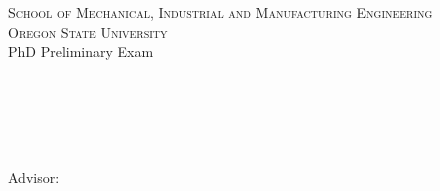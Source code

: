 \documentclass[12pt, oneside]{book} %
\newcommand\BackgroundPic{%
\put(-250,-160){%
\parbox[b][\paperheight]{\paperwidth}{%
\vfill
\centering
\texttt{[image: symbol.jpg]}%
\vfill
}}}
\begin{document}

\pagestyle{empty} %
\frontmatter %

\begin{titlepage}
\begin{center}
\vfill
{\large \scshape School of Mechanical, Industrial and Manufacturing Engineering \\Oregon State University}\\[1.4cm]
{\Large PhD Preliminary Exam}\\[1.4cm]
{\huge \bfseries \thesistitle \par \ }\\[-0.5cm]
\hfill  \\[1cm]
\hfill  {\large \bfseries\name}\\
\vfill
{\hfill \large Advisor: \textbf{\advisor}} \\ 
\ifx\coadvisor\undefined{} \\ \fi
\vspace{1cm}
\hfill  \submissiondate
\end{center}
\end{titlepage}


\pagestyle{fancy} %
\renewcommand{\chaptermark}[1]{ \markboth{#1}{}} %
\renewcommand{\sectionmark}[1]{\markright{\thesection\; #1}} %
\fancyhf{}%
\fancyhead[RO,L]{\thepage} %

% 

\end{document}
